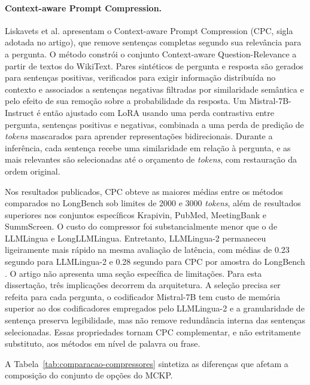 \paragraph{Context-aware Prompt Compression.}
Liskavets et al. \cite{li2024cpc} apresentam o Context-aware Prompt Compression (CPC, sigla adotada no artigo), que remove sentenças completas segundo sua relevância para a pergunta. O método constrói o conjunto Context-aware Question-Relevance a partir de textos do WikiText. Pares sintéticos de pergunta e resposta são gerados para sentenças positivas, verificados para exigir informação distribuída no contexto e associados a sentenças negativas filtradas por similaridade semântica e pelo efeito de sua remoção sobre a probabilidade da resposta. Um Mistral-7B-Instruct é então ajustado com LoRA usando uma perda contrastiva entre pergunta, sentenças positivas e negativas, combinada a uma perda de predição de \textit{tokens} mascarados para aprender representações bidirecionais. Durante a inferência, cada sentença recebe uma similaridade em relação à pergunta, e as mais relevantes são selecionadas até o orçamento de \textit{tokens}, com restauração da ordem original.

Nos resultados publicados, CPC obteve as maiores médias entre os métodos comparados no LongBench sob limites de 2000 e 3000 \textit{tokens}, além de resultados superiores nos conjuntos específicos Krapivin, PubMed, MeetingBank e SummScreen. O custo do compressor foi substancialmente menor que o de LLMLingua e LongLLMLingua. Entretanto, LLMLingua-2 permaneceu ligeiramente mais rápido na mesma avaliação de latência, com médias de 0.23 segundo para LLMLingua-2 e 0.28 segundo para CPC por amostra do LongBench \cite{li2024cpc}. O artigo não apresenta uma seção específica de limitações. Para esta dissertação, três implicações decorrem da arquitetura. A seleção precisa ser refeita para cada pergunta, o codificador Mistral-7B tem custo de memória superior ao dos codificadores empregados pelo LLMLingua-2 e a granularidade de sentença preserva legibilidade, mas não remove redundância interna das sentenças selecionadas. Essas propriedades tornam CPC complementar, e não estritamente substituto, aos métodos em nível de palavra ou frase.

A Tabela~\ref{tab:comparacao-compressores} sintetiza as diferenças que afetam a composição do conjunto de opções do MCKP.

